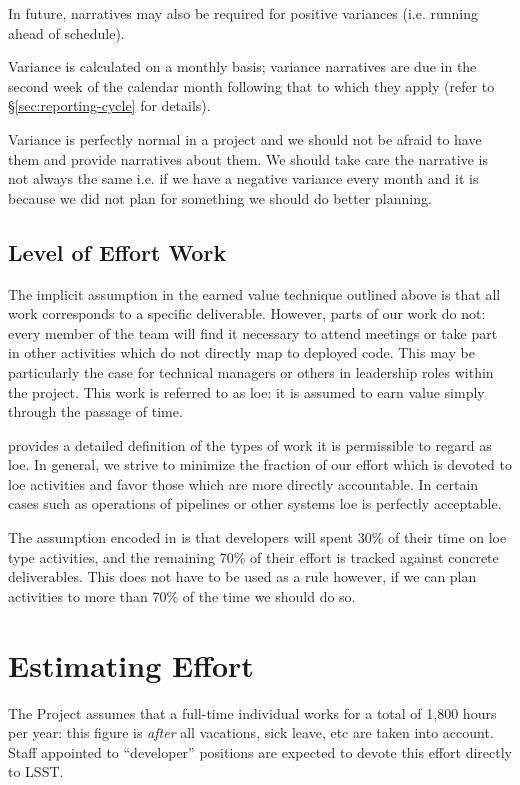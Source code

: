 In future, narratives may also be required for positive variances (i.e. running ahead of schedule).

Variance is calculated on a monthly basis; variance narratives are due in the second week of the calendar month following that to which they apply (refer to \S\ref{sec:reporting-cycle} for details).

Variance is perfectly normal in a project and we should not be afraid to have them and provide narratives about them. We should take care the narrative is not always the same i.e. if we have a negative variance every month and it is because we did not plan for something we should do better planning.

\subsection{Level of Effort Work}
\label{sec:loe}

The implicit assumption in the earned value technique outlined above is that all work corresponds to a specific deliverable.
However, parts of our work do not: every member of the team will find it necessary to attend meetings or take part in other activities which do not directly map to deployed code.
This may be particularly the case for technical managers or others in leadership roles within the project.
This work is referred to as \gls{loe}: it is assumed to earn value simply through the passage of time.

 provides a detailed definition of the types of work it is permissible to regard as \gls{loe}.
In general, we strive to minimize the fraction of our effort which is devoted to \gls{loe} activities and favor those which are more directly accountable.
In certain cases such as operations of pipelines or other systems \gls{loe} is perfectly acceptable.

The assumption encoded in  is that developers will spent 30\% of their time on \gls{loe} type activities, and the remaining 70\% of their effort is tracked against concrete deliverables.
This does not have to be used as a rule however, if we can plan activities to more than 70\% of the time we should do so.

\section{Estimating Effort}
\label{sec:effort}

The Project assumes that a full-time individual works for a total of
1,800 hours per year: this figure is \emph{after} all vacations, sick
leave, etc are taken into account. Staff appointed to ``developer''
positions are expected to devote this effort directly to LSST.

